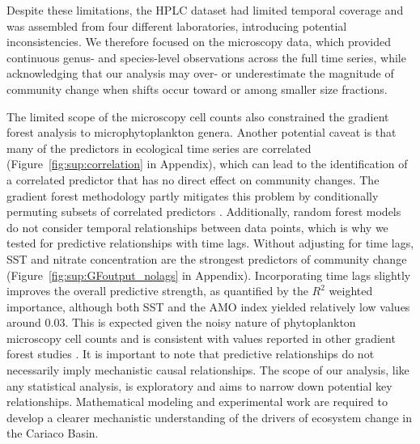 \documentclass[]{agujournal2019}
\begin{document}
    Despite these limitations, the HPLC dataset had limited temporal coverage and was assembled from four different laboratories, introducing potential inconsistencies. We therefore focused on the microscopy data, which provided continuous genus- and species-level observations across the full time series, while acknowledging that our analysis may over- or underestimate the magnitude of community change when shifts occur toward or among smaller size fractions.

    The limited scope of the microscopy cell counts also constrained the gradient forest analysis to microphytoplankton genera. 
    Another potential caveat is that many of the predictors in ecological time series are correlated (Figure~\ref{fig:sup:correlation} in Appendix), which can lead to the identification of a correlated predictor that has no direct effect on community changes. The gradient forest methodology partly mitigates this problem by conditionally permuting subsets of correlated predictors \cite{ellis_gradient_2012}. Additionally, random forest models do not consider temporal relationships between data points, which is why we tested for predictive relationships with time lags. Without adjusting for time lags, SST and nitrate concentration are the strongest predictors of community change (Figure~\ref{fig:sup:GFoutput_nolags} in Appendix). Incorporating time lags slightly improves the overall predictive strength, as quantified by the $R^2$ weighted importance, although both SST and the AMO index yielded relatively low values around 0.03. This is expected given the noisy nature of phytoplankton microscopy cell counts and is consistent with values reported in other gradient forest studies \cite{pitcher_exploring_2012, roubeix_identification_2016, samhouri_defining_2017, fraker_temporal_2022}. It is important to note that predictive relationships do not necessarily imply mechanistic causal relationships. The scope of our analysis, like any statistical analysis, is exploratory and aims to narrow down potential key relationships. Mathematical modeling and experimental work are required to develop a clearer mechanistic understanding of the drivers of ecosystem change in the Cariaco Basin.
\end{document}
